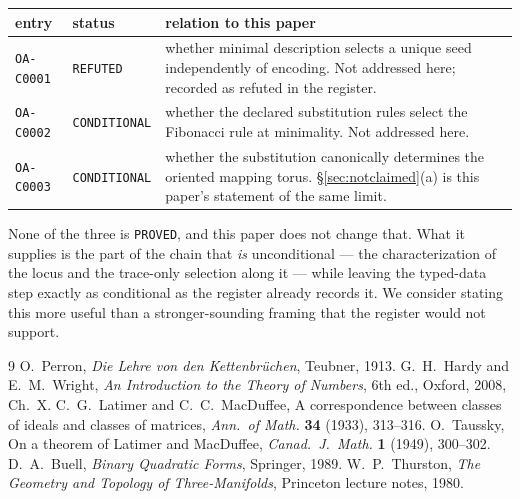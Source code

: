 \documentclass[11pt,a4paper]{article}
\theoremstyle{definition}
\theoremstyle{remark}
\begin{document}
\begin{center}
\begin{tabular}{@{}llp{7.2cm}@{}}
\toprule
entry & status & relation to this paper \\
\midrule
\texttt{OA-C0001} & \texttt{REFUTED}    & whether minimal description selects a unique seed independently of encoding. Not addressed here; recorded as refuted in the register. \\
\texttt{OA-C0002} & \texttt{CONDITIONAL}& whether the declared substitution rules select the Fibonacci rule at minimality. Not addressed here. \\
\texttt{OA-C0003} & \texttt{CONDITIONAL}& whether the substitution canonically determines the oriented mapping torus. \S\ref{sec:notclaimed}(a) is this paper's statement of the same limit. \\
\bottomrule
\end{tabular}
\end{center}

\noindent
None of the three is \texttt{PROVED}, and this paper does not change that. What it supplies is
the part of the chain that \emph{is} unconditional --- the characterization of the locus and the
trace-only selection along it --- while leaving the typed-data step exactly as conditional as
the register already records it. We consider stating this more useful than a stronger-sounding
framing that the register would not support.

\begin{thebibliography}{9}
 O.~Perron, \emph{Die Lehre von den Kettenbr\"uchen}, Teubner, 1913.
 G.~H.~Hardy and E.~M.~Wright, \emph{An Introduction to the Theory of
  Numbers}, 6th ed., Oxford, 2008, Ch.~X.
 C.~G.~Latimer and C.~C.~MacDuffee, A correspondence between classes
  of ideals and classes of matrices, \emph{Ann.\ of Math.} \textbf{34} (1933), 313--316.
 O.~Taussky, On a theorem of Latimer and MacDuffee, \emph{Canad.\ J.\ Math.}
  \textbf{1} (1949), 300--302.
 D.~A.~Buell, \emph{Binary Quadratic Forms}, Springer, 1989.
 W.~P.~Thurston, \emph{The Geometry and Topology of Three-Manifolds},
  Princeton lecture notes, 1980.
\end{thebibliography}
\end{document}
